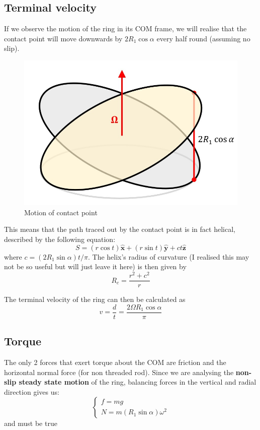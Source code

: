\documentclass{scrartcl}
\begin{document}
\subsection{Terminal velocity}
If we observe the motion of the ring in its COM frame, we will realise that the contact point will move downwards by $2R_1\cos\alpha$ every half round (assuming no slip).

\begin{figure}[htbp]
    \centering
    \includegraphics[scale=0.5]{diagram5.jpg}
    \caption{Motion of contact point}
    \label{5}
\end{figure}
This means that the path traced out by the contact point is in fact helical, described by the following equation:
\begin{equation}
    S=(r \cos t)\mathbf{\hat{x}} +(r \sin t)\mathbf{\hat{y}}+ct\mathbf{\hat{z}}
\end{equation}
where $c=(2R_1\sin\alpha )t/\pi$.
The helix's radius of curvature (I realised this may not be so useful but will just leave it here) is then given by
\begin{equation}
    R_c= \frac{r^2+c^2}{r}
\end{equation}


The terminal velocity of the ring can then be calculated as \begin{equation}
    v= \frac{d}{t}= \frac{2\Omega R_1 \cos\alpha}{\pi}
\end{equation}

\subsection{Torque}
The only 2 forces that exert torque about the COM are friction and the horizontal normal force (for non threaded rod). Since we are analysing the \textbf{non-slip steady state motion} of the ring, balancing forces in the vertical and radial direction gives us:
\begin{equation}
    \begin{cases}
        f=mg \\
        N=m(R_1\sin\alpha)\omega^2
    \end{cases}
\end{equation} and  must be true
\end{document}
